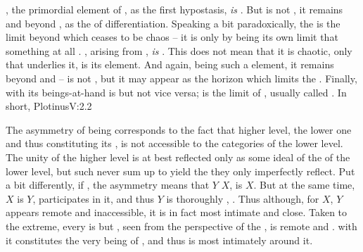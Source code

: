 , the primordial element of , as the first hypostasis, {\em
  is} . But  is not , it remains  and beyond
, as the  of differentiation. Speaking a bit
paradoxically, the  is the limit beyond which  ceases to be
chaos -- it is only by being its own limit that something at all .
, arising from , {\em is} . This does not
mean that it is chaotic, only that  underlies it, is its 
element. And again, being such a  element, it remains beyond and
  --  is not , but it may
appear as the horizon which limits the . Finally,  with its beings-at-hand is  but not vice versa;
   is the 
limit of , usually called . In short, \citet{there
  is from the first principle to ultimate an outgoing in which unfailingly each
  principle retains its own seat while its off-shot takes another rank, a lower,
  though on the other hand every being is in identity with its prior as long as
  it holds that contact.}{Plotinus}{V:2.2}


\pa\label{pa:immanentTranscendent}
The asymmetry of being corresponds to the fact that higher level,
 the lower one and thus constituting its , is not
accessible to the categories of the lower level.  %
The unity of the higher level is at best reflected only as some ideal
 of the 
 of the lower level, but such  never sum up to yield
the  they only imperfectly reflect. 
Put a bit differently, if , the asymmetry means that $Y$
 $X$, is  $X$. But at the same time, $X$ is 
$Y$, participates in it, and thus $Y$ is thoroughly ,
. Thus although, for $X$, $Y$ appears remote and inaccessible, it is
in fact most intimate and close. Taken to the extreme, every  is
 but , seen from the perspective of the ,
is remote and .     with it
constitutes the very being of , and thus  is most
intimately  around it.


